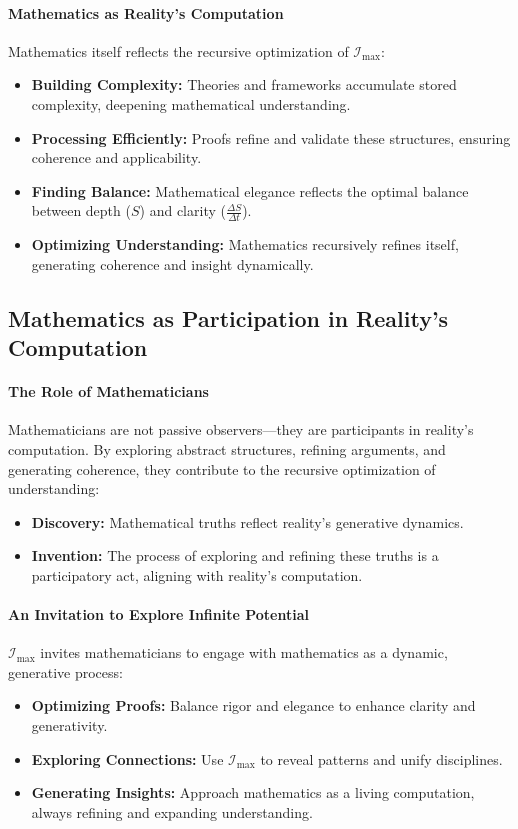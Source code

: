 \documentclass[12pt]{article}
\begin{document}
\paragraph{Mathematics as Reality’s Computation}
Mathematics itself reflects the recursive optimization of \(\mathcal{I}_{\text{max}}\):
\begin{itemize}
    \item \textbf{Building Complexity:}  
    Theories and frameworks accumulate stored complexity, deepening mathematical understanding.
    \item \textbf{Processing Efficiently:}  
    Proofs refine and validate these structures, ensuring coherence and applicability.
    \item \textbf{Finding Balance:}  
    Mathematical elegance reflects the optimal balance between depth (\(S\)) and clarity (\(\frac{\Delta S}{\Delta t}\)).
    \item \textbf{Optimizing Understanding:}  
    Mathematics recursively refines itself, generating coherence and insight dynamically.
\end{itemize}

\subsection{Mathematics as Participation in Reality’s Computation}

\paragraph{The Role of Mathematicians}
Mathematicians are not passive observers—they are participants in reality’s computation. By exploring abstract structures, refining arguments, and generating coherence, they contribute to the recursive optimization of understanding:
\begin{itemize}
    \item \textbf{Discovery:}  
    Mathematical truths reflect reality’s generative dynamics.
    \item \textbf{Invention:}  
    The process of exploring and refining these truths is a participatory act, aligning with reality’s computation.
\end{itemize}

\paragraph{An Invitation to Explore Infinite Potential}
\(\mathcal{I}_{\text{max}}\) invites mathematicians to engage with mathematics as a dynamic, generative process:
\begin{itemize}
    \item \textbf{Optimizing Proofs:}  
    Balance rigor and elegance to enhance clarity and generativity.
    \item \textbf{Exploring Connections:}  
    Use \(\mathcal{I}_{\text{max}}\) to reveal patterns and unify disciplines.
    \item \textbf{Generating Insights:}  
    Approach mathematics as a living computation, always refining and expanding understanding.
\end{itemize}
\end{document}

